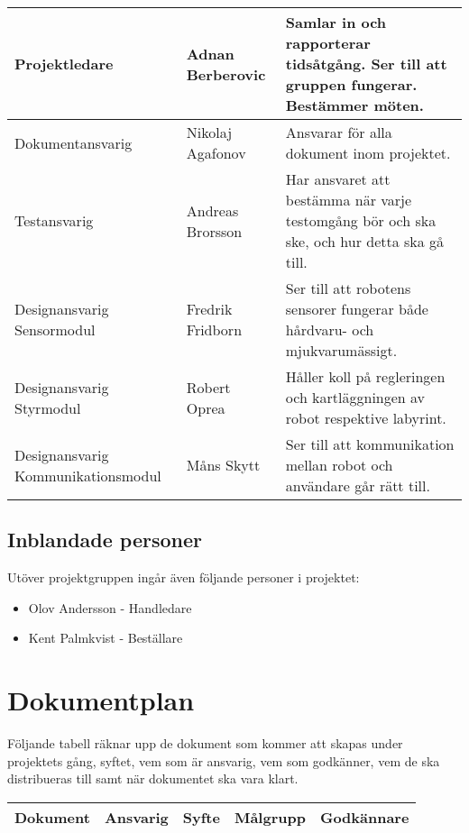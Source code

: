 \documentclass[11pt]{article}
\begin{document}
\begin{flushleft}
\begin{tabu} to 1.05\textwidth { | X[c] | X[c] | X[c] | }
\hline
Projektledare & Adnan Berberovic & Samlar in och rapporterar tidsåtgång. Ser till att gruppen fungerar. Bestämmer möten. \\
\hline
Dokumentansvarig & Nikolaj Agafonov & Ansvarar för alla dokument inom projektet.\\
\hline
Testansvarig & Andreas Brorsson & Har ansvaret att bestämma när varje testomgång bör och ska ske, och hur detta ska gå till. \\ 
\hline
Designansvarig Sensormodul & Fredrik Fridborn  & Ser till att robotens sensorer fungerar både hårdvaru- och mjukvarumässigt.\\
\hline
Designansvarig Styrmodul & Robert Oprea & Håller koll på regleringen och kartläggningen av robot respektive labyrint.\\
\hline
Designansvarig Kommunikationsmodul & Måns Skytt & Ser till att kommunikation mellan robot och användare går rätt till. \\
\hline
 \end{tabu}
 
\subsection{Inblandade personer}
Utöver projektgruppen ingår även följande personer i projektet:
\begin{itemize}
	\item Olov Andersson - Handledare
	\item Kent Palmkvist - Beställare
\end{itemize}


\pagebreak

\section{Dokumentplan}
Följande tabell räknar upp de dokument som kommer att skapas under projektets gång, syftet, vem som är ansvarig, vem som godkänner, vem de ska distribueras till samt när dokumentet ska vara klart.
\begin{center}
\begin{longtable}{|p{.28\linewidth}|p{.1\linewidth}|p{.25\linewidth}|p{.19\linewidth}|p{.15\linewidth}|}\hline
\textbf{Dokument} & \textbf{Ansvarig} & \textbf{Syfte} & \textbf{Målgrupp} & \textbf{Godkännare} \\ \hline


\end{longtable}
\end{center}
\end{flushleft}
\end{document}

